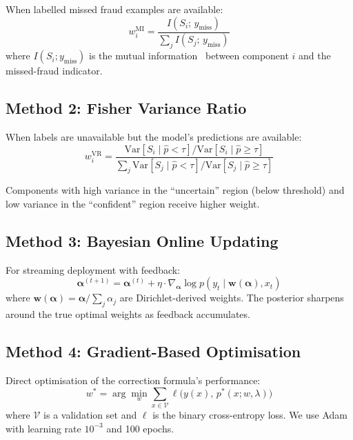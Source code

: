 \documentclass[journal]{IEEEtran}
\begin{document}
When labelled missed fraud examples are available:
\begin{equation}
  w_i^{\text{MI}} = \frac{I(S_i;\, y_{\text{miss}})}{\sum_j I(S_j;\, y_{\text{miss}})}
  \label{eq:mi_weight}
\end{equation}
where $I(S_i; y_{\text{miss}})$ is the mutual information~\cite{cover2006} between component $i$ and the missed-fraud indicator.

\subsection{Method 2: Fisher Variance Ratio}
\label{ssec:fisher}

When labels are unavailable but the model's predictions are available:
\begin{equation}
  w_i^{\text{VR}} = \frac{\text{Var}[S_i \mid \hat{p} < \tau] / \text{Var}[S_i \mid \hat{p} \geq \tau]}{\sum_j \text{Var}[S_j \mid \hat{p} < \tau] / \text{Var}[S_j \mid \hat{p} \geq \tau]}
  \label{eq:vr_weight}
\end{equation}

Components with high variance in the ``uncertain'' region (below threshold) and low variance in the ``confident'' region receive higher weight.

\subsection{Method 3: Bayesian Online Updating}
\label{ssec:bayesian}

For streaming deployment with feedback:
\begin{equation}
  \bm{\alpha}^{(t+1)} = \bm{\alpha}^{(t)} + \eta \cdot \nabla_{\bm{\alpha}} \log p(y_t \mid \bm{w}(\bm{\alpha}), x_t)
  \label{eq:bayesian}
\end{equation}
where $\bm{w}(\bm{\alpha}) = \bm{\alpha}/\sum_j \alpha_j$ are Dirichlet-derived weights. The posterior sharpens around the true optimal weights as feedback accumulates.

\subsection{Method 4: Gradient-Based Optimisation}
\label{ssec:gradient}

Direct optimisation of the correction formula's performance:
\begin{equation}
  w^* = \arg\min_w \sum_{x \in \mathcal{V}} \ell\bigl(y(x),\, p^*(x; w, \lambda)\bigr)
  \label{eq:gradient}
\end{equation}
where $\mathcal{V}$ is a validation set and $\ell$ is the binary cross-entropy loss. We use Adam with learning rate $10^{-3}$ and 100 epochs.
\end{document}
